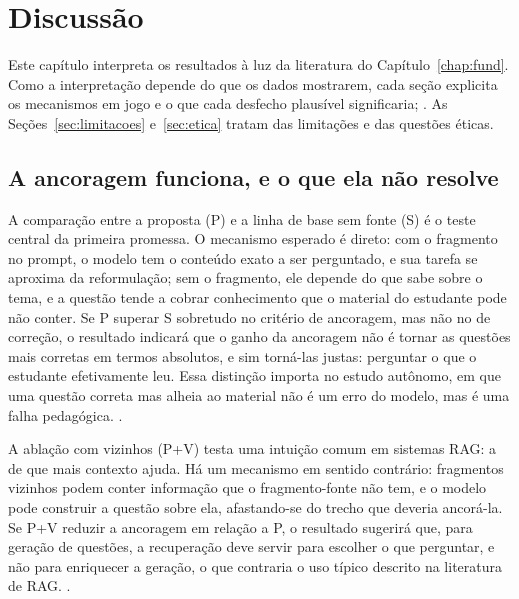 \chapter{\label{chap:discussao}Discussão}

Este capítulo interpreta os resultados à luz da literatura do Capítulo~\ref{chap:fund}. Como a interpretação depende do que os dados mostrarem, cada seção explicita os mecanismos em jogo e o que cada desfecho plausível significaria; . As Seções~\ref{sec:limitacoes} e~\ref{sec:etica} tratam das limitações e das questões éticas.

\section{A ancoragem funciona, e o que ela não resolve}

A comparação entre a proposta (P) e a linha de base sem fonte (S) é o teste central da primeira promessa. O mecanismo esperado é direto: com o fragmento no prompt, o modelo tem o conteúdo exato a ser perguntado, e sua tarefa se aproxima da reformulação; sem o fragmento, ele depende do que sabe sobre o tema, e a questão tende a cobrar conhecimento que o material do estudante pode não conter. Se P superar S sobretudo no critério de ancoragem, mas não no de correção, o resultado indicará que o ganho da ancoragem não é tornar as questões mais corretas em termos absolutos, e sim torná-las justas: perguntar o que o estudante efetivamente leu. Essa distinção importa no estudo autônomo, em que uma questão correta mas alheia ao material não é um erro do modelo, mas é uma falha pedagógica. .

A ablação com vizinhos (P+V) testa uma intuição comum em sistemas RAG: a de que mais contexto ajuda. Há um mecanismo em sentido contrário: fragmentos vizinhos podem conter informação que o fragmento-fonte não tem, e o modelo pode construir a questão sobre ela, afastando-se do trecho que deveria ancorá-la. Se P+V reduzir a ancoragem em relação a P, o resultado sugerirá que, para geração de questões, a recuperação deve servir para escolher o que perguntar, e não para enriquecer a geração, o que contraria o uso típico descrito na literatura de RAG. .

